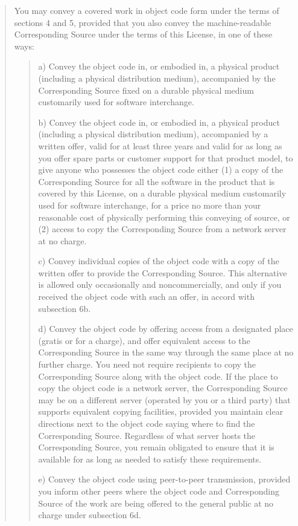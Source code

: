 \documentclass[letterpaper,10pt,english]{sphinxmanual}
\begin{document}
\begin{quote}
\begin{enumerate}
\end{enumerate}

You may convey a covered work in object code form under the terms
of sections 4 and 5, provided that you also convey the
machine-readable Corresponding Source under the terms of this License,
in one of these ways:
\begin{quote}

a) Convey the object code in, or embodied in, a physical product
(including a physical distribution medium), accompanied by the
Corresponding Source fixed on a durable physical medium
customarily used for software interchange.

b) Convey the object code in, or embodied in, a physical product
(including a physical distribution medium), accompanied by a
written offer, valid for at least three years and valid for as
long as you offer spare parts or customer support for that product
model, to give anyone who possesses the object code either (1) a
copy of the Corresponding Source for all the software in the
product that is covered by this License, on a durable physical
medium customarily used for software interchange, for a price no
more than your reasonable cost of physically performing this
conveying of source, or (2) access to copy the
Corresponding Source from a network server at no charge.

c) Convey individual copies of the object code with a copy of the
written offer to provide the Corresponding Source.  This
alternative is allowed only occasionally and noncommercially, and
only if you received the object code with such an offer, in accord
with subsection 6b.

d) Convey the object code by offering access from a designated
place (gratis or for a charge), and offer equivalent access to the
Corresponding Source in the same way through the same place at no
further charge.  You need not require recipients to copy the
Corresponding Source along with the object code.  If the place to
copy the object code is a network server, the Corresponding Source
may be on a different server (operated by you or a third party)
that supports equivalent copying facilities, provided you maintain
clear directions next to the object code saying where to find the
Corresponding Source.  Regardless of what server hosts the
Corresponding Source, you remain obligated to ensure that it is
available for as long as needed to satisfy these requirements.

e) Convey the object code using peer-to-peer transmission, provided
you inform other peers where the object code and Corresponding
Source of the work are being offered to the general public at no
charge under subsection 6d.
\end{quote}


\end{quote}
\end{document}
